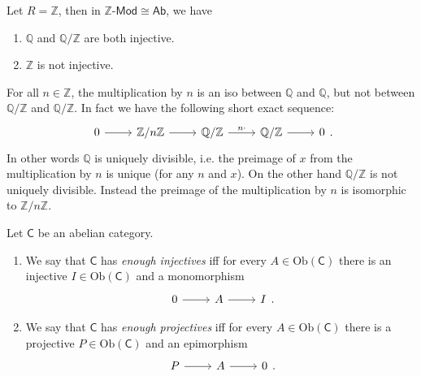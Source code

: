 \documentclass[../Main]{subfiles}
\begin{document}
\begin{cor}
	Let $R = \mathbb{Z}$, then in $\mathbb{Z}\text{-}\mathsf{Mod} \cong \mathsf{Ab}$, we have
	\begin{enumerate}
		\item $\mathbb{Q}$ and $\mathbb{Q}/\mathbb{Z}$ are both injective.
		\item $\mathbb{Z}$ is not injective.
	\end{enumerate}
\end{cor} 

\begin{rem}[]
	For all $n \in \mathbb{Z}$, the multiplication by $n$ is an iso
	between $\mathbb{Q}$ and $\mathbb{Q}$, but not
	between $\mathbb{Q}/\mathbb{Z}$ and $\mathbb{Q}/\mathbb{Z}$.
	In fact we have the following short exact sequence:
	\begin{equation}
	\begin{tikzcd}
		0 \arrow[r, "", rightarrow] &
		\mathbb{Z}/n\mathbb{Z} \arrow[r, "", rightarrow] &
		\mathbb{Q}/\mathbb{Z} \arrow[r, "n\cdot", rightarrow] &
		\mathbb{Q}/\mathbb{Z} \arrow[r, "", rightarrow] &
		0
	\end{tikzcd}
	.\end{equation} 
	In other words $\mathbb{Q}$ is uniquely divisible,
	i.e. the preimage of $x$ from the multiplication by $n$
	is unique (for any $n$ and $x$).
	On the other hand $\mathbb{Q}/\mathbb{Z}$ is not uniquely divisible.
	Instead the preimage of the multiplication by $n$ is isomorphic to
	$\mathbb{Z}/n\mathbb{Z}$.
\end{rem}

\begin{defn}[]
	Let $\mathsf{C}$ be an abelian category.
	\begin{enumerate}
		\item We say that $\mathsf{C}$ has {\em enough injectives}
			iff for every $A \in \mathrm{Ob} \left(\mathsf{C}\right)$
			there is an injective $I \in \mathrm{Ob} \left(\mathsf{C}\right)$
			and a monomorphism
			\begin{equation}
			\begin{tikzcd}
				0 \arrow[r, "", rightarrow] &
				A \arrow[r, "", rightarrow] &
				I
			\end{tikzcd}
			.\end{equation} 
		\item We say that $\mathsf{C}$ has {\em enough projectives}
			iff for every $A \in \mathrm{Ob} \left(\mathsf{C}\right)$
			there is a projective $P \in \mathrm{Ob} \left(\mathsf{C}\right)$
			and an epimorphism
			\begin{equation}
			\begin{tikzcd}
				P \arrow[r, "", rightarrow] &
				A \arrow[r, "", rightarrow] &
				0
			\end{tikzcd}
			.\end{equation} 
	\end{enumerate}
\end{defn}
\end{document}
